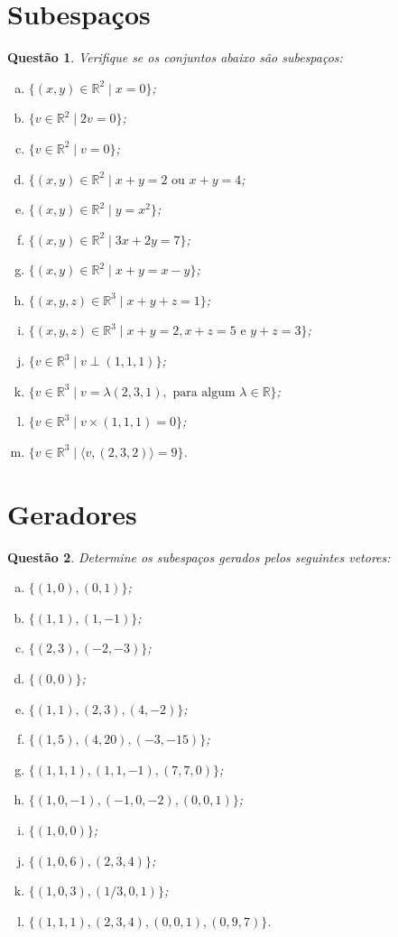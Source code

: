 \documentclass[a4paper,12pt]{article}
\def\R{\mathbb R}
\newtheorem{qst}{Questão}[section]
\begin{document}
\section{Subespaços}
\begin{qst}
	Verifique se os conjuntos abaixo são subespaços:
	\begin{enumerate}[a)]
		\item $\{(x,y)\in\R^2\mid x=0\}$;
		\item $\{v\in\R^2\mid 2v=0\}$;
		\item $\{v\in \R^2\mid v=0\}$;
		\item $\{(x,y)\in \R^2\mid x+y=2 \mbox{ ou }x+y=4$;
		\item $\{(x,y)\in \R^2\mid y=x^2\}$;
		\item $\{(x,y)\in \R^2\mid 3x+2y=7\}$;
		\item $\{(x,y)\in \R^2\mid x+y=x-y\}$;
		\item $\{(x,y,z)\in \R^3\mid x+y+z=1\}$;
		\item $\{(x,y,z)\in \R^3\mid x+y=2,x+z=5 \mbox{ e } y+z=3\}$;
		\item $\{v\in \R^3\mid v\perp(1,1,1)\}$;
		\item $\{v\in \R^3\mid v=\lambda(2,3,1),\mbox{ para algum }\lambda\in \R\}$;
		\item $\{v\in \R^3\mid v\times (1,1,1)=0\}$;
		\item $\{v\in \R^3\mid \langle v,(2,3,2)\rangle = 9\}$.
	\end{enumerate}
\end{qst}
\pagebreak
\section{Geradores}
\begin{qst}
	Determine os subespaços gerados pelos seguintes vetores:
	\begin{enumerate}[a)]		
		\item $\{(1,0),(0,1)\}$;
		\item $\{(1,1),(1,-1)\}$;
		\item $\{(2,3),(-2,-3)\}$;
		\item $\{(0,0)\}$;
		\item $\{(1,1), (2,3),(4,-2)\}$;
		\item $\{(1,5), (4,20), (-3,-15)\}$;
		\item $\{(1,1,1),(1,1,-1),(7,7,0)\}$;
		\item $\{(1,0,-1),(-1,0,-2), (0,0,1)\}$;
		\item $\{(1,0,0)\}$;
		\item $\{(1,0,6),(2,3,4)\}$;
		\item $\{(1,0,3),(1/3,0,1)\}$;
		\item $\{(1,1,1),(2,3,4),(0,0,1),(0,9,7)\}$.
	\end{enumerate}
\end{qst}
\end{document}
